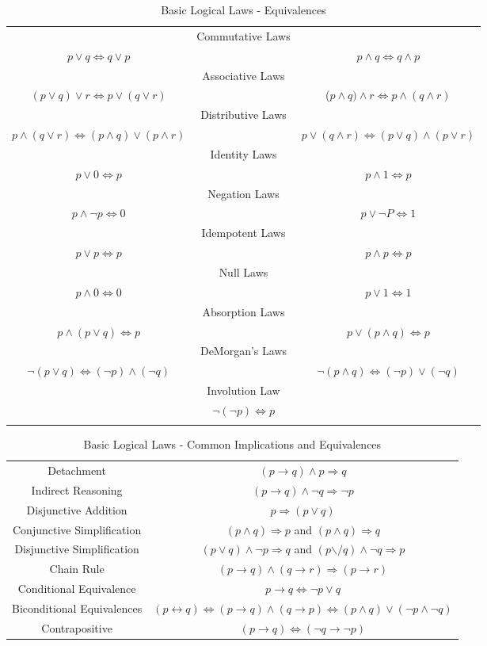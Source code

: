 \documentclass[10pt,]{book}
\theoremstyle{plain}
\theoremstyle{definition}
\theoremstyle{definition}
\theoremstyle{definition}
\theoremstyle{definition}
\newcommand{\hrulemedium}{\noalign{\hrule height 0.07em}}
\begin{document}
\leavevmode%
\begin{table}
\centering
\begin{tabular}{ccc}
&Commutative Laws&\tabularnewline[0pt]
 \(p \lor  q\Leftrightarrow q\lor p\)  && \(p \land q\Leftrightarrow q \land p\)\tabularnewline\hrulemedium
&Associative Laws&\tabularnewline[0pt]
\((p \lor  q) \lor r \Leftrightarrow  p \lor  (q \lor  r)\)&&(\(p \land q) \land r\Leftrightarrow p \land  (q \land  r)\)\tabularnewline\hrulemedium
&Distributive Laws&\tabularnewline[0pt]
\(p \land  (q \lor  r) \Leftrightarrow  (p \land  q ) \lor  (p \land  r)\)&&\(p \lor  (q \land  r) \Leftrightarrow  (p \lor  q) \land (p \lor r)\) \tabularnewline\hrulemedium
&Identity Laws&\tabularnewline[0pt]
\(p \lor  0\Leftrightarrow p\)&& \(p \land  1 \Leftrightarrow p\)\tabularnewline\hrulemedium
&Negation Laws&\tabularnewline[0pt]
\(p\land \neg p\Leftrightarrow 0\)&& \(p\lor \neg P\Leftrightarrow 1\)\tabularnewline\hrulemedium
&Idempotent Laws&\tabularnewline[0pt]
\(p \lor  p \Leftrightarrow p\) &&  \(p\land p \Leftrightarrow p\)\tabularnewline\hrulemedium
&Null Laws&\tabularnewline[0pt]
\(p \land 0 \Leftrightarrow 0\) && \(p \lor  1 \Leftrightarrow 1\)\tabularnewline\hrulemedium
&Absorption Laws&\tabularnewline[0pt]
\(p \land (p\lor  q)\Leftrightarrow p\)&&\(p \lor  (p \land  q) \Leftrightarrow  p\)\tabularnewline\hrulemedium
&DeMorgan's Laws&\tabularnewline[0pt]
\(\neg (p \lor  q) \Leftrightarrow  (\neg p) \land  (\neg q)\)&&\(\neg (p \land  q) \Leftrightarrow  (\neg p) \lor  (\neg q)\)\tabularnewline\hrulemedium
&Involution Law&\tabularnewline[0pt]
& \(\neg (\neg p)\Leftrightarrow p\)&\tabularnewline\hrulemedium
\end{tabular}
\caption{Basic Logical Laws - Equivalences\label{table-equivalences}}
\end{table}
\leavevmode%
\begin{table}
\centering
\begin{tabular}{cc}
Detachment&
\((p \rightarrow  q) \land  p\Rightarrow  q\)\tabularnewline\hrulemedium
Indirect Reasoning&
\((p \to  q) \land  \neg q \Rightarrow  \neg p\)\tabularnewline\hrulemedium
Disjunctive Addition&
\(p\Rightarrow (p\lor q)\)\tabularnewline\hrulemedium
Conjunctive Simplification&
 \((p \land  q) \Rightarrow  p\) and \((p \land  q) \Rightarrow  q\)\tabularnewline\hrulemedium
Disjunctive Simplification&
 \((p \lor  q) \land  \neg p \Rightarrow  q\) and \((p\text{$\backslash $/} q) \land \neg q\Rightarrow p\)\tabularnewline\hrulemedium
Chain Rule&
\((p \to  q) \land  ( q \rightarrow  r) \Rightarrow  (p\to  r)\)
\tabularnewline\hrulemedium
Conditional Equivalence&
 \(p \rightarrow  q \Leftrightarrow  \neg p \lor  q\)\tabularnewline\hrulemedium
Biconditional Equivalences&
 \((p \leftrightarrow  q) \Leftrightarrow  (p\rightarrow q) \land  (q \rightarrow  p)\Leftrightarrow (p \land  q) \lor  (\neg p \land  \neg q)\)\tabularnewline\hrulemedium
Contrapositive&
 \((p\to q) \Leftrightarrow (\neg q \to \neg p)\)
\end{tabular}
\caption{Basic Logical Laws - Common Implications and Equivalences\label{table-implications}}
\end{table}
\typeout{************************************************}
\typeout{************************************************}
\end{document}
